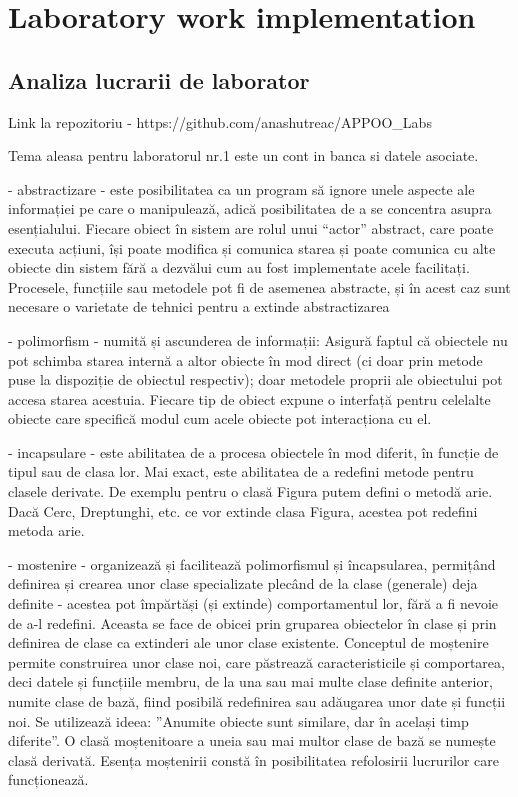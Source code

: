 \section{Laboratory work implementation}



\subsection{Analiza lucrarii de laborator}

Link la repozitoriu - https://github.com/anashutreac/APPOO\_Labs

Tema aleasa pentru laboratorul nr.1 este un cont in banca si datele asociate. 

- abstractizare - este posibilitatea ca un program să ignore unele aspecte ale informației pe care o manipulează, adică posibilitatea de a se concentra asupra esențialului. Fiecare obiect în sistem are rolul unui “actor” abstract, care poate executa acțiuni, își poate modifica și comunica starea și poate comunica cu alte obiecte din sistem fără a dezvălui cum au fost implementate acele facilitați. Procesele, funcțiile sau metodele pot fi de asemenea abstracte, și în acest caz sunt necesare o varietate de tehnici pentru a extinde abstractizarea

- polimorfism - numită și ascunderea de informații: Asigură faptul că obiectele nu pot schimba starea internă a altor obiecte în mod direct (ci doar prin metode puse la dispoziție de obiectul respectiv); doar metodele proprii ale obiectului pot accesa starea acestuia. Fiecare tip de obiect expune o interfață pentru celelalte obiecte care specifică modul cum acele obiecte pot interacționa cu el.

- incapsulare - este abilitatea de a procesa obiectele în mod diferit, în funcție de tipul sau de clasa lor. Mai exact, este abilitatea de a redefini metode pentru clasele derivate. De exemplu pentru o clasă Figura putem defini o metodă arie. Dacă Cerc, Dreptunghi, etc. ce vor extinde clasa Figura, acestea pot redefini metoda arie.

- mostenire - organizează și facilitează polimorfismul și încapsularea, permițând definirea și crearea unor clase specializate plecând de la clase (generale) deja definite - acestea pot împărtăși (și extinde) comportamentul lor, fără a fi nevoie de a-l redefini. Aceasta se face de obicei prin gruparea obiectelor în clase și prin definirea de clase ca extinderi ale unor clase existente. Conceptul de moștenire permite construirea unor clase noi, care păstrează caracteristicile și comportarea, deci datele și funcțiile membru, de la una sau mai multe clase definite anterior, numite clase de bază, fiind posibilă redefinirea sau adăugarea unor date și funcții noi. Se utilizează ideea: ”Anumite obiecte sunt similare, dar în același timp diferite”. O clasă moștenitoare a uneia sau mai multor clase de bază se numește clasă derivată. Esența moștenirii constă în posibilitatea refolosirii lucrurilor care funcționează.






\clearpage